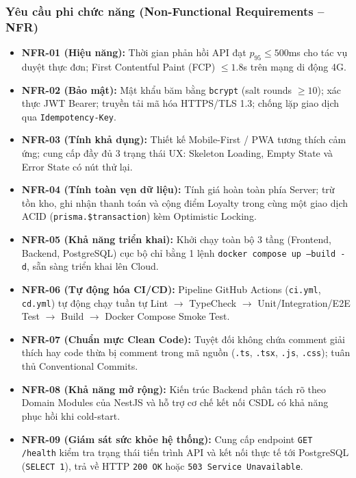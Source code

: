 \documentclass[a4paper,12pt]{article}
\begin{document}
\subsubsection{Yêu cầu phi chức năng (Non-Functional Requirements -- NFR)}
\begin{itemize}
  \item \textbf{NFR-01 (Hiệu năng):} Thời gian phản hồi API đạt $p_{95} \le 500$ms cho tác vụ duyệt thực đơn; First Contentful Paint (FCP) $\le 1.8$s trên mạng di động 4G.
  \item \textbf{NFR-02 (Bảo mật):} Mật khẩu băm bằng \texttt{bcrypt} (salt rounds $\ge 10$); xác thực JWT Bearer; truyền tải mã hóa HTTPS/TLS 1.3; chống lặp giao dịch qua \texttt{Idempotency-Key}.
  \item \textbf{NFR-03 (Tính khả dụng):} Thiết kế Mobile-First / PWA tương thích cảm ứng; cung cấp đầy đủ 3 trạng thái UX: Skeleton Loading, Empty State và Error State có nút thử lại.
  \item \textbf{NFR-04 (Tính toàn vẹn dữ liệu):} Tính giá hoàn toàn phía Server; trừ tồn kho, ghi nhận thanh toán và cộng điểm Loyalty trong cùng một giao dịch ACID (\texttt{prisma.\$transaction}) kèm Optimistic Locking.
  \item \textbf{NFR-05 (Khả năng triển khai):} Khởi chạy toàn bộ 3 tầng (Frontend, Backend, PostgreSQL) cục bộ chỉ bằng 1 lệnh \texttt{docker compose up --build -d}, sẵn sàng triển khai lên Cloud.
  \item \textbf{NFR-06 (Tự động hóa CI/CD):} Pipeline GitHub Actions (\texttt{ci.yml}, \texttt{cd.yml}) tự động chạy tuần tự Lint $\rightarrow$ TypeCheck $\rightarrow$ Unit/Integration/E2E Test $\rightarrow$ Build $\rightarrow$ Docker Compose Smoke Test.
  \item \textbf{NFR-07 (Chuẩn mực Clean Code):} Tuyệt đối không chứa comment giải thích hay code thừa bị comment trong mã nguồn (\texttt{.ts}, \texttt{.tsx}, \texttt{.js}, \texttt{.css}); tuân thủ Conventional Commits.
  \item \textbf{NFR-08 (Khả năng mở rộng):} Kiến trúc Backend phân tách rõ theo Domain Modules của NestJS và hỗ trợ cơ chế kết nối CSDL có khả năng phục hồi khi cold-start.
  \item \textbf{NFR-09 (Giám sát sức khỏe hệ thống):} Cung cấp endpoint \texttt{GET /health} kiểm tra trạng thái tiến trình API và kết nối thực tế tới PostgreSQL (\texttt{SELECT 1}), trả về HTTP \texttt{200 OK} hoặc \texttt{503 Service Unavailable}.
\end{itemize}
\end{document}
